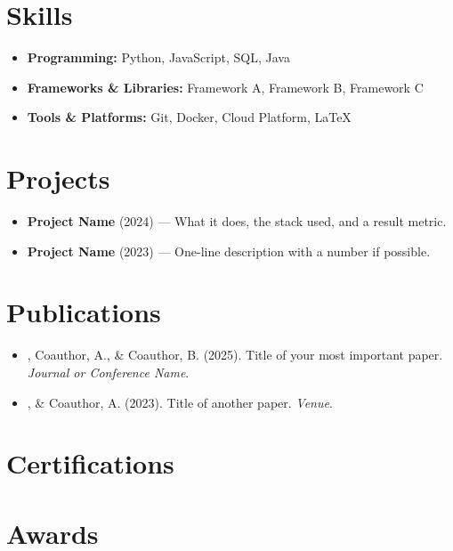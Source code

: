 \documentclass[10pt,letterpaper]{article}   %
\begin{document}
\section*{Skills}
\begin{itemize}
  \item \textbf{Programming:} Python, JavaScript, SQL, Java
  \item \textbf{Frameworks \& Libraries:} Framework A, Framework B, Framework C
  \item \textbf{Tools \& Platforms:} Git, Docker, Cloud Platform, \LaTeX
\end{itemize}

\section*{Projects}
\begin{itemize}
  \item \textbf{Project Name} (2024) --- What it does, the stack used, and a result metric.
  \item \textbf{Project Name} (2023) --- One-line description with a number if possible.
\end{itemize}

\section*{Publications}
\begin{itemize}
  \item {}, Coauthor, A., \& Coauthor, B. (2025). Title of your most
        important paper. \textit{Journal or Conference Name}.
  \item {}, \& Coauthor, A. (2023). Title of another paper. \textit{Venue}.
\end{itemize}

\section*{Certifications}

\section*{Awards}
\end{document}
